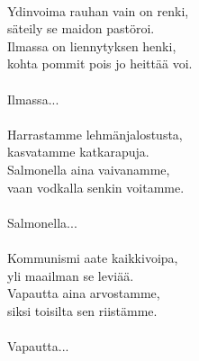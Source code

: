 \hspace{10mm} \\ Ydinvoima rauhan vain on renki, \\ säteily se maidon pastöroi. \\ Ilmassa on liennytyksen henki, \\ kohta pommit pois jo heittää voi. \\ \hspace{10mm} \\ Ilmassa... \\ \hspace{10mm} \\ Harrastamme lehmänjalostusta, \\ kasvatamme katkarapuja. \\ Salmonella aina vaivanamme, \\ vaan vodkalla senkin voitamme. \\ \hspace{10mm} \\ Salmonella... \\ \hspace{10mm} \\ Kommunismi aate kaikkivoipa, \\ yli maailman se leviää. \\ Vapautta aina arvostamme, \\ siksi toisilta sen riistämme. \\ \hspace{10mm} \\ Vapautta...